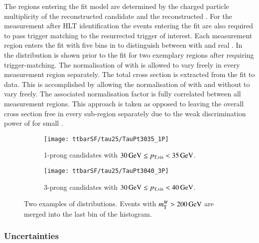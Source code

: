 The regions entering the fit model are determined by the charged
particle multiplicity of the reconstructed \tauhadvis candidate and
the reconstructed \tauhadvis \pT. For the measurement after HLT
\tauhadvis identification the events entering the fit are also
required to pass trigger matching to the resurrected trigger of
interest. Each measurement region enters the fit with five bins in
\mTW to distinguish between \ttbar with \faketauhadvis and real
\tauhadvis. In~ the \mTW
distribution is shown prior to the fit for two exemplary regions after
requiring trigger-matching.  The normalisation of \ttbar with
\faketauhadvis is allowed to vary freely in every measurement region
separately. The total \ttbar cross section is extracted from the fit
to data. This is accomplished by allowing the normalisation of \ttbar
with and without \faketauhadvis to vary freely. The associated
normalisation factor is fully correlated between all measurement
regions. This approach is taken as opposed to leaving the overall
\ttbar cross section free in every sub-region separately due to the
weak discrimination power of \mTW for small \tauhadvis \pT.


\begin{figure}[htbp]
  \centering

  \begin{subfigure}{.485\textwidth}
    \texttt{[image: ttbarSF/tau25/TauPt3035\_1P]}
    \caption{1-prong \tauhadvis candidates with
      $\SI{30}{\ensuremath{\text{GeV}}} \leq p_\text{T,vis} < \SI{35}{\ensuremath{\text{GeV}}}$.}
  \end{subfigure}\hfill%
  \begin{subfigure}{.485\textwidth}
    \texttt{[image: ttbarSF/tau25/TauPt3040\_3P]}
    \caption{3-prong \tauhadvis candidates with
      $\SI{30}{\GeV} \leq \pTvis < \SI{40}{\GeV}$.}
  \end{subfigure}

  \caption{Two examples of \mTW distributions. Events with
    $m_{\text{T}}^W > \SI{200}{\ensuremath{\text{GeV}}}$ are merged into the last bin of the
    histogram.}
  \label{fig:ttbarsf_mtw_examples_prefit}
\end{figure}


\subsubsection{Uncertainties}

